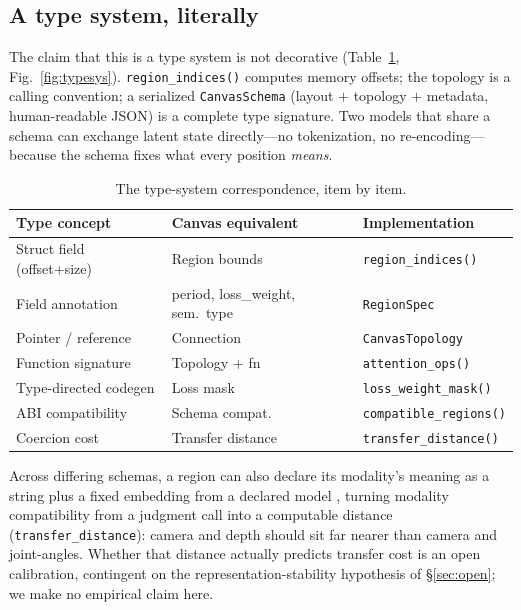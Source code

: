 \documentclass[10pt,twocolumn]{article}
\newcommand{\code}[1]{\texttt{\small #1}}
\begin{document}
\subsection{A type system, literally}
The claim that this is a type system is not decorative (Table~\ref{tab:types}, Fig.~\ref{fig:typesys}). \code{region\_indices()} computes memory offsets; the topology is a calling convention; a serialized \code{CanvasSchema} (layout $+$ topology $+$ metadata, human-readable JSON) is a complete type signature. Two models that share a schema can exchange latent state directly---no tokenization, no re-encoding---because the schema fixes what every position \emph{means}.

\begin{table}[t]
\centering
\small
\caption{The type-system correspondence, item by item.}
\label{tab:types}
\begin{tabular}{@{}p{2.55cm}p{2.25cm}p{2.35cm}@{}}
\toprule
Type concept & Canvas equivalent & Implementation \\
\midrule
Struct field (offset+size) & Region bounds & \code{region\_indices()} \\
Field annotation & period, loss\_weight, sem.\ type & \code{RegionSpec} \\
Pointer / reference & Connection & \code{CanvasTopology} \\
Function signature & Topology + fn & \code{attention\_ops()} \\
Type-directed codegen & Loss mask & \code{loss\_weight\_mask()} \\
ABI compatibility & Schema compat. & \code{compatible\_regions()} \\
Coercion cost & Transfer distance & \code{transfer\_distance()} \\
\bottomrule
\end{tabular}
\end{table}

Across differing schemas, a region can also declare its modality's meaning as a string plus a fixed embedding from a declared model \cite{radford2021clip}, turning modality compatibility from a judgment call into a computable distance (\code{transfer\_distance}): camera and depth should sit far nearer than camera and joint-angles. Whether that distance actually predicts transfer cost is an open calibration, contingent on the representation-stability hypothesis of \S\ref{sec:open}; we make no empirical claim here.
\end{document}
